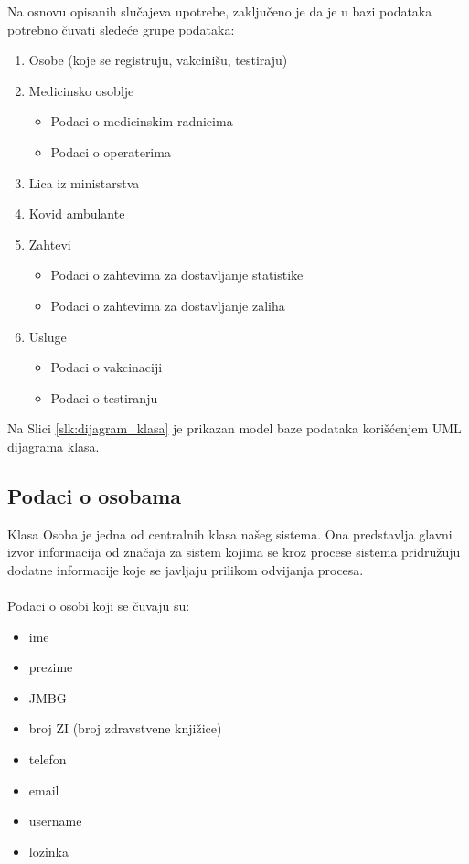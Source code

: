 \documentclass[titlepage]{article}
\begin{document}
Na osnovu opisanih slučajeva upotrebe, zaključeno je da je u bazi podataka potrebno čuvati sledeće grupe podataka:

\begin{enumerate}
    \item Osobe (koje se registruju, vakcinišu, testiraju)
    \item Medicinsko osoblje
    \begin{itemize}
        \item Podaci o medicinskim radnicima
        \item Podaci o operaterima
    \end{itemize}
    \item Lica iz ministarstva
    \item Kovid ambulante
    \item Zahtevi
    \begin{itemize}
        \item Podaci o zahtevima za dostavljanje statistike
        \item Podaci o zahtevima za dostavljanje zaliha
    \end{itemize}
    \item Usluge
    \begin{itemize}
        \item Podaci o vakcinaciji
        \item Podaci o testiranju
    \end{itemize}
\end{enumerate}

Na Slici \ref{slk:dijagram_klasa} je prikazan model baze podataka korišćenjem UML dijagrama klasa.


\subsection{Podaci o osobama}

Klasa Osoba je jedna od centralnih klasa našeg sistema. Ona predstavlja glavni izvor informacija od značaja za sistem kojima se kroz procese sistema pridružuju dodatne informacije koje se javljaju prilikom odvijanja procesa. \\ \\
Podaci o osobi koji se čuvaju su:

\begin{itemize}
    \item ime
    \item prezime
    \item JMBG
    \item broj ZI (broj zdravstvene knjižice)
    \item telefon
    \item email
    \item username
    \item lozinka
\end{itemize}
\end{document}
